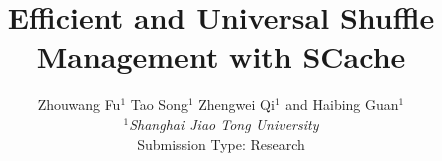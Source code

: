\documentclass[10pt,twocolumn]{article}
\begin{document}
\title{Efficient and Universal Shuffle Management with SCache}
\author{Zhouwang Fu$^1$ Tao Song$^1$ Zhengwei Qi$^1$ and Haibing Guan$^1$\\
\small {\em  $^1$Shanghai Jiao Tong University} \\ [2mm]
\small Submission Type: Research
}
\date{}
\maketitle















\end{document}
